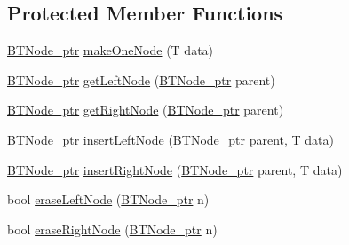 \subsection*{Protected Member Functions}
\begin{DoxyCompactItemize}
\item 
\hyperlink{class_binary_tree_a35ef67d8ee2843144c5c309c5a6ecd5b}{B\+T\+Node\+\_\+ptr} \hyperlink{class_binary_tree_a46ac40cb1527a3f22336588f08c55c47}{make\+One\+Node} (T data)
\item 
\hyperlink{class_binary_tree_a35ef67d8ee2843144c5c309c5a6ecd5b}{B\+T\+Node\+\_\+ptr} \hyperlink{class_binary_tree_a0cbb93d97da33b5b8e5d3d1cc39b273c}{get\+Left\+Node} (\hyperlink{class_binary_tree_a35ef67d8ee2843144c5c309c5a6ecd5b}{B\+T\+Node\+\_\+ptr} parent)
\item 
\hyperlink{class_binary_tree_a35ef67d8ee2843144c5c309c5a6ecd5b}{B\+T\+Node\+\_\+ptr} \hyperlink{class_binary_tree_a4d7abf750994e1fa5c414339aff21d4b}{get\+Right\+Node} (\hyperlink{class_binary_tree_a35ef67d8ee2843144c5c309c5a6ecd5b}{B\+T\+Node\+\_\+ptr} parent)
\item 
\hyperlink{class_binary_tree_a35ef67d8ee2843144c5c309c5a6ecd5b}{B\+T\+Node\+\_\+ptr} \hyperlink{class_binary_tree_a3f9a69eef172b096c09c75aa3317bda1}{insert\+Left\+Node} (\hyperlink{class_binary_tree_a35ef67d8ee2843144c5c309c5a6ecd5b}{B\+T\+Node\+\_\+ptr} parent, T data)
\item 
\hyperlink{class_binary_tree_a35ef67d8ee2843144c5c309c5a6ecd5b}{B\+T\+Node\+\_\+ptr} \hyperlink{class_binary_tree_ade1255b6ba7ae7af6922459c59ac2e8c}{insert\+Right\+Node} (\hyperlink{class_binary_tree_a35ef67d8ee2843144c5c309c5a6ecd5b}{B\+T\+Node\+\_\+ptr} parent, T data)
\item 
bool \hyperlink{class_binary_tree_ad8b70f4e657c980a41d31a7b06181ab8}{erase\+Left\+Node} (\hyperlink{class_binary_tree_a35ef67d8ee2843144c5c309c5a6ecd5b}{B\+T\+Node\+\_\+ptr} n)
\item 
bool \hyperlink{class_binary_tree_a7ab8cd0a33045182fe7465e7c1e2d795}{erase\+Right\+Node} (\hyperlink{class_binary_tree_a35ef67d8ee2843144c5c309c5a6ecd5b}{B\+T\+Node\+\_\+ptr} n)
\end{DoxyCompactItemize}

